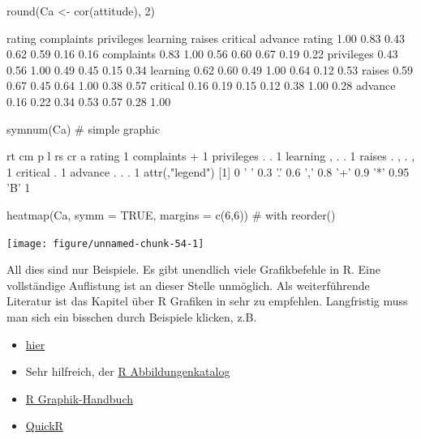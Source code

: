 \documentclass[a4paper,twoside]{tufte-book}\usepackage[]{graphicx}\usepackage[]{color}
\begin{document}
\begin{appendices}
\begin{Schunk}
\begin{Sinput}
round(Ca <- cor(attitude), 2)
\end{Sinput}
\begin{Soutput}
           rating complaints privileges learning raises critical advance
rating       1.00       0.83       0.43     0.62   0.59     0.16    0.16
complaints   0.83       1.00       0.56     0.60   0.67     0.19    0.22
privileges   0.43       0.56       1.00     0.49   0.45     0.15    0.34
learning     0.62       0.60       0.49     1.00   0.64     0.12    0.53
raises       0.59       0.67       0.45     0.64   1.00     0.38    0.57
critical     0.16       0.19       0.15     0.12   0.38     1.00    0.28
advance      0.16       0.22       0.34     0.53   0.57     0.28    1.00
\end{Soutput}
\begin{Sinput}
symnum(Ca) # simple graphic
\end{Sinput}
\begin{Soutput}
           rt cm p l rs cr a
rating     1                
complaints +  1             
privileges .  .  1          
learning   ,  .  . 1        
raises     .  ,  . , 1      
critical             .  1   
advance          . . .     1
attr(,"legend")
[1] 0 ' ' 0.3 '.' 0.6 ',' 0.8 '+' 0.9 '*' 0.95 'B' 1
\end{Soutput}
\begin{Sinput}
heatmap(Ca, symm = TRUE, margins = c(6,6)) # with reorder()
\end{Sinput}


{\centering \texttt{[image: figure/unnamed-chunk-54-1]} 

}

\end{Schunk}

All dies sind nur Beispiele. Es gibt unendlich viele Grafikbefehle in R. Eine vollständige Auflistung ist an dieser Stelle unmöglich. Als weiterführende Literatur ist das Kapitel über R Grafiken in \citet{Ligges-ProgrammierenmitR-2008} sehr zu empfehlen. Langfristig muss man sich ein bisschen durch Beispiele klicken, z.B.

\begin{itemize}
\item \href{http://rgraphgallery.blogspot.de/search/label/3%20vartiable%20plots}{hier}
\item Sehr hilfreich, der \href{http://shiny.stat.ubc.ca/r-graph-catalog/#}{R Abbildungenkatalog}
\item \href{http://rgm3.lab.nig.ac.jp/RGM/R_image_list?page=2282&init=true}{R Graphik-Handbuch}
\item \href{http://www.statmethods.net/graphs/line.html}{QuickR}
\end{itemize}



\end{appendices}
\end{document}
